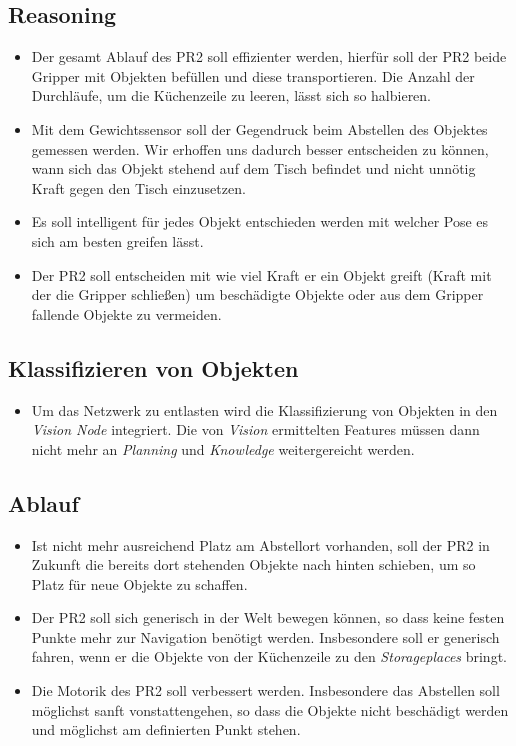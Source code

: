 \documentclass{suturo}
\begin{document}
\subsection*{Reasoning}
\begin{itemize}
\item Der gesamt Ablauf des PR2 soll effizienter werden, hierfür soll der PR2 beide Gripper mit Objekten befüllen und diese transportieren. Die Anzahl der Durchläufe, um die Küchenzeile zu leeren, lässt sich so halbieren.
\item Mit dem Gewichtssensor soll der Gegendruck beim Abstellen des Objektes gemessen werden. Wir erhoffen uns dadurch besser entscheiden zu können, wann sich das Objekt stehend auf dem Tisch befindet und nicht unnötig Kraft gegen den Tisch einzusetzen.
\item Es soll intelligent für jedes Objekt entschieden werden mit welcher Pose es sich am besten greifen lässt.
\item Der PR2 soll entscheiden mit wie viel Kraft er ein Objekt greift (Kraft mit der die Gripper schließen) um beschädigte Objekte oder aus dem Gripper fallende Objekte zu vermeiden.
\end{itemize}

\subsection*{Klassifizieren von Objekten}
\begin{itemize}
\item Um das Netzwerk zu entlasten wird die Klassifizierung von Objekten in den \textit{Vision Node} integriert. Die von \textit{Vision} ermittelten Features müssen dann nicht mehr an \textit{Planning} und \textit{Knowledge} weitergereicht werden.
\end{itemize}

\subsection*{Ablauf}
\begin{itemize}
\item Ist nicht mehr ausreichend Platz am Abstellort vorhanden, soll der PR2 in Zukunft die bereits dort stehenden Objekte nach hinten schieben, um so Platz für neue Objekte zu schaffen.
\item Der PR2 soll sich generisch in der Welt bewegen können, so dass keine festen Punkte mehr zur Navigation benötigt werden. Insbesondere soll er generisch fahren, wenn er die Objekte von der Küchenzeile zu den \textit{Storageplaces} bringt.
\item Die Motorik des PR2 soll verbessert werden. Insbesondere das Abstellen soll möglichst sanft vonstattengehen, so dass die Objekte nicht beschädigt werden und möglichst am definierten Punkt stehen.
\end{itemize}
\end{document}
